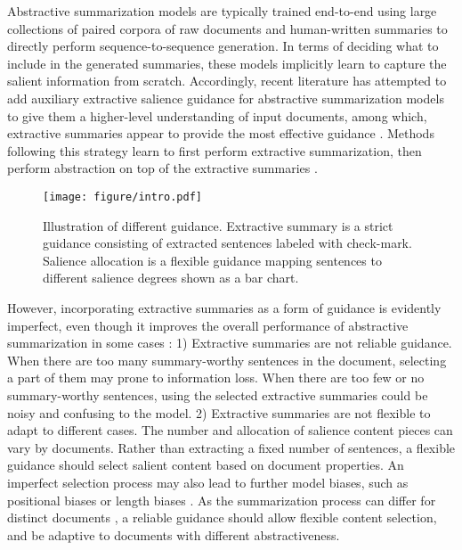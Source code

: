 \documentclass[11pt]{article}
\newcommand{\FIGUREINTRO}{
    \begin{figure}[t]
      \begin{center}
        \texttt{[image: figure/intro.pdf]} \end{center}
          \caption{Illustration of different guidance. Extractive summary is a strict guidance consisting of extracted sentences labeled with check-mark. Salience allocation is a flexible guidance mapping sentences to different salience degrees shown as a bar chart.}
      
      \label{fig:intro}
      \vspace{-0.5em}
    \end{figure}
}
\begin{document}
Abstractive summarization models are typically trained end-to-end using large collections of paired corpora of raw documents and human-written summaries to directly perform sequence-to-sequence generation.
In terms of deciding what to include in the generated summaries, these models implicitly learn to capture the salient information from scratch.
Accordingly, recent literature has attempted to add auxiliary extractive salience guidance for abstractive summarization models to give them a higher-level understanding of input documents,
among which, extractive summaries appear to provide the most effective guidance
\cite{li2020keywords,jin2020semsum,dou2021gsum}.
Methods following this strategy learn to first perform extractive summarization, then perform abstraction on top of the extractive summaries \cite{hsu2018unified,pilault2020extractive,dou2021gsum}.

\FIGUREINTRO

However, incorporating extractive summaries as a form of guidance is evidently imperfect, even though it improves the overall performance of abstractive summarization in some cases \cite{dou2021gsum}: 1) Extractive summaries are not reliable guidance. When there are too many summary-worthy sentences in the document, selecting a part of them may prone to information loss.
When there are too few or no summary-worthy sentences, using the selected extractive summaries could be noisy and confusing to the model.
2) Extractive summaries are not flexible to adapt to different cases.
The number and allocation of salience content pieces can vary by documents. Rather than extracting a fixed number of sentences, a flexible guidance should select salient content based on document properties.
An imperfect selection process may also lead to further model biases, such as positional biases or length biases \cite{zhong-etal-2019-searching}.
As the summarization process can differ for distinct documents \cite{grusky2018newsroom,koupaee2018wikihow}, a reliable guidance should allow flexible content selection, and be adaptive to documents with different abstractiveness.
\end{document}
